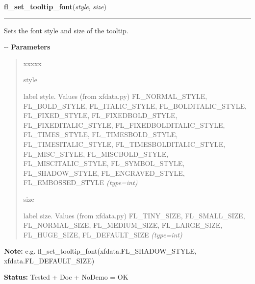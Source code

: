 \hspace{.8\funcindent}\begin{boxedminipage}{\funcwidth}

    \raggedright \textbf{fl\_set\_tooltip\_font}(\textit{style}, \textit{size})

    \vspace{-1.5ex}

    \rule{\textwidth}{0.5\fboxrule}
\setlength{\parskip}{2ex}

Sets the font style and size of the tooltip.

-{}-
\setlength{\parskip}{1ex}
      \textbf{Parameters}
      \vspace{-1ex}

      \begin{quote}
        \begin{Ventry}{xxxxx}

          \item[style]


label style. Values (from xfdata.py) FL\_NORMAL\_STYLE, FL\_BOLD\_STYLE,
FL\_ITALIC\_STYLE, FL\_BOLDITALIC\_STYLE, FL\_FIXED\_STYLE,
FL\_FIXEDBOLD\_STYLE, FL\_FIXEDITALIC\_STYLE, FL\_FIXEDBOLDITALIC\_STYLE,
FL\_TIMES\_STYLE, FL\_TIMESBOLD\_STYLE, FL\_TIMESITALIC\_STYLE,
FL\_TIMESBOLDITALIC\_STYLE, FL\_MISC\_STYLE, FL\_MISCBOLD\_STYLE,
FL\_MISCITALIC\_STYLE, FL\_SYMBOL\_STYLE, FL\_SHADOW\_STYLE,
FL\_ENGRAVED\_STYLE, FL\_EMBOSSED\_STYLE
            {\it (type=int)}

          \item[size]


label size. Values (from xfdata.py) FL\_TINY\_SIZE, FL\_SMALL\_SIZE,
FL\_NORMAL\_SIZE, FL\_MEDIUM\_SIZE, FL\_LARGE\_SIZE, FL\_HUGE\_SIZE,
FL\_DEFAULT\_SIZE
            {\it (type=int)}

        \end{Ventry}

      \end{quote}

\textbf{Note:} 
e.g. fl\_set\_tooltip\_font(xfdata.FL\_SHADOW\_STYLE,
xfdata.FL\_DEFAULT\_SIZE)


\textbf{Status:} 
Tested + Doc + NoDemo = OK


    \end{boxedminipage}

    \label{xformslib:flgoodies:fl_set_tooltip_color}

